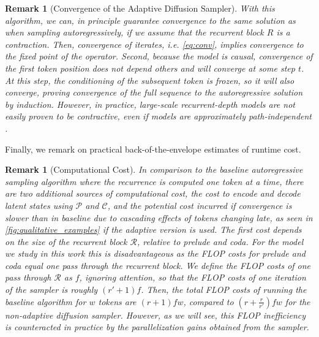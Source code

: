 \documentclass{article} %
\theoremstyle{definition}
\theoremstyle{plain}
\newtheorem{remark}[theorem]{Remark}
\begin{document}
\begin{remark}[Convergence of the Adaptive Diffusion Sampler]
    With this algorithm, we can, in principle guarantee convergence to the same solution as when sampling autoregressively, if we assume that the recurrent block $R$ is a contraction. Then,  convergence of iterates, i.e. \cref{eq:conv}, implies convergence to the fixed point of the operator. Second, because the model is causal, convergence of the first token position does not depend others and will converge at some step $t$. At this step, the conditioning of the subsequent token is frozen, so it will also converge, proving convergence of the full sequence to the autoregressive solution by induction. However, in practice, large-scale recurrent-depth models are not easily proven to be contractive, even if models are approximately path-independent \citep{anil_path_2022}.
\end{remark}

Finally, we remark on practical back-of-the-envelope estimates of runtime cost. 
\begin{remark}[Computational Cost]
In comparison to the baseline autoregressive sampling algorithm where the recurrence is computed one token at a time, there are two additional sources of computational cost, the cost to encode and decode latent states using $\mathcal{P}$ and $\mathcal{C}$, and the potential cost incurred if convergence is slower than in baseline due to cascading effects of tokens changing late, as seen in \cref{fig:qualitative_examples} if the adaptive version is used. The first cost depends on the size of the recurrent block $\mathcal{R}$, relative to prelude and coda. For the model we study in this work this is  disadvantageous as the FLOP costs for prelude and coda equal one pass through the recurrent block. We define the FLOP costs of one pass through $\mathcal{R}$ as $f$, ignoring attention, so that the FLOP costs of one iteration of the sampler is roughly $(r'+1)f$. Then, the total FLOP costs of running the baseline algorithm for $w$ tokens are  $(r+1)f w$, compared to  $(r+\frac{r}{r'})f w$ for the non-adaptive diffusion sampler. However, as we will see, this FLOP inefficiency is counteracted in practice by the  parallelization gains obtained from the sampler.
\end{remark}

\end{document}
